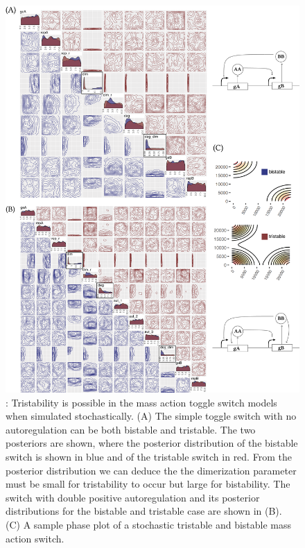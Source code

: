\begin{figure}[htbp]
\centerfloat
\includegraphics[width=1.1\textwidth]{../../chapters/chapterStabilityFinder/images/MA_stoch_design_princ.png}
\caption[Multistability in the stochastic mass action models]{ \label{fig:fig7}: Tristability is possible in the mass action toggle switch models when simulated stochastically. (A) The simple toggle switch with no autoregulation can be both bistable and tristable. The two posteriors are shown, where the posterior distribution of the bistable switch is shown in blue and of the tristable switch in red. From the posterior distribution we can deduce the the dimerization parameter must be small for tristability to occur but large for bistability. The switch with double positive autoregulation and its posterior distributions for the bistable and tristable case are shown in (B). (C) A sample phase plot of a stochastic tristable and bistable mass action switch. }
\end{figure}
\clearpage


